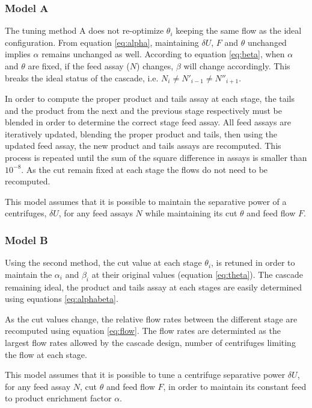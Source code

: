 \subsubsection{Model A}

The tuning method A does not re-optimize $\theta_i$ keeping the same flow as the
ideal configuration. From equation \eqref{eq:alpha}, maintaining $\delta U$, $F$
and $\theta$ unchanged implies $\alpha$ remains unchanged as well. According to
equation \eqref{eq:beta}, when $\alpha$ and $\theta$ are fixed, if the feed
assay ($N$) changes, $\beta$ will change accordingly.  This breaks the
ideal status of the cascade, i.e. $N_{i} \neq N'_{i-1} \neq N''_{i+1}$.


In order to compute the proper product and tails assay at each stage, the tails
and the product from the next and the previous stage respectively must be
blended in order to determine the correct stage feed assay. All feed assays are
iteratively updated, blending the proper product and tails, then using the
updated feed assay, the new product and tails assays are recomputed. This
process is repeated until the sum of the square difference in assays is smaller
than $10^{-8}$.  As the cut remain fixed at each stage the flows do not need to
be recomputed.

This model assumes that it is possible to maintain the separative power of a
centrifuges, $\delta U$, for any feed assays $N$ while maintaining its cut
$\theta$ and feed flow $F$.

\subsubsection{Model B}

Using the second method, the cut value at each stage $\theta_i$, is retuned in
order to maintain the $\alpha_i$ and $\beta_i$ at their original values
(equation \eqref{eq:theta}). The cascade remaining ideal, the product and tails
assay at each stages are easily determined using equations \eqref{eq:alphabeta}.

As the cut values change, the relative flow rates between the different stage
are recomputed using equation \eqref{eq:flow}. The flow rates are determinted as
the largest flow rates allowed by the cascade design, number of centrifuges
limiting the flow at each stage.

This model assumes that it is possible to tune a centrifuge separative power
$\delta U$, for any feed assay $N$, cut $\theta$ and feed flow $F$, in order to
maintain its constant feed to product enrichment factor $\alpha$.




